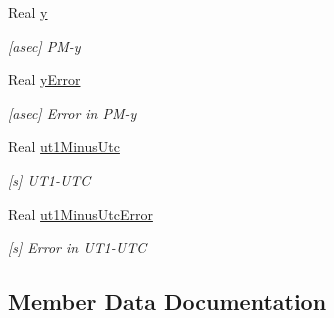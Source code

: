 \begin{DoxyCompactItemize}
Real \hyperlink{structlibrary_1_1physics_1_1coord_1_1frame_1_1provider_1_1iers_1_1_bulletin_a_1_1_observation_ab8bcd7a4111e2e8410e0957cc2b3c786}{y}
\begin{DoxyCompactList}\small\item\em \mbox{[}asec\mbox{]} P\+M-\/y \end{DoxyCompactList}\item 
Real \hyperlink{structlibrary_1_1physics_1_1coord_1_1frame_1_1provider_1_1iers_1_1_bulletin_a_1_1_observation_aed497275ab6623d82fd54a1649af5162}{y\+Error}
\begin{DoxyCompactList}\small\item\em \mbox{[}asec\mbox{]} Error in P\+M-\/y \end{DoxyCompactList}\item 
Real \hyperlink{structlibrary_1_1physics_1_1coord_1_1frame_1_1provider_1_1iers_1_1_bulletin_a_1_1_observation_aaa89d8b9f2dfbcf265c78366f0924ab6}{ut1\+Minus\+Utc}
\begin{DoxyCompactList}\small\item\em \mbox{[}s\mbox{]} U\+T1-\/\+U\+TC \end{DoxyCompactList}\item 
Real \hyperlink{structlibrary_1_1physics_1_1coord_1_1frame_1_1provider_1_1iers_1_1_bulletin_a_1_1_observation_afb26a9f72f836e27d96fbfe2cef7c1d6}{ut1\+Minus\+Utc\+Error}
\begin{DoxyCompactList}\small\item\em \mbox{[}s\mbox{]} Error in U\+T1-\/\+U\+TC \end{DoxyCompactList}\end{DoxyCompactItemize}


\subsection{Member Data Documentation}
\mbox{\label{structlibrary_1_1physics_1_1coord_1_1frame_1_1provider_1_1iers_1_1_bulletin_a_1_1_observation_a46330732f314a4ad4e64da78b1225f3b}} 
